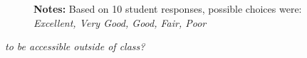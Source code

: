 \begin{boenumerate}
\begin{itemize}
\begin{figure}[h!]\centering
{}\hspace{0.75cm}
\begin{center}
\begin{minipage}[t]{0.85\columnwidth}\vspace{-0.75cm}
\item\scriptsize{\textbf{Notes:} Based on 10 student responses, possible choices were: \emph{Excellent, Very Good, Good, Fair, Poor} }
\end{minipage}
\end{center}
\end{figure}
\item \textit{to be accessible outside of class?}


\end{itemize}
\end{boenumerate}
